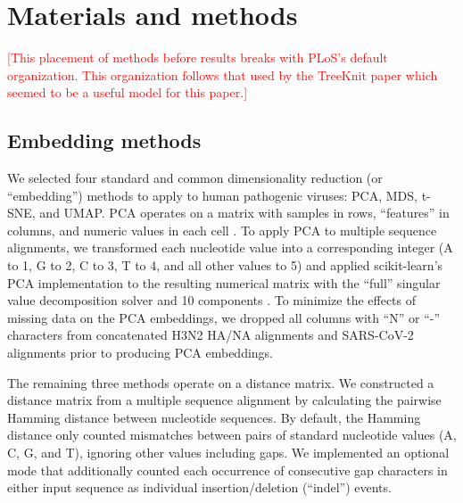 \documentclass[10pt,letterpaper]{article}
\def\jhc#1{\textcolor{red}{[#1]}}
\begin{document}
\section*{Materials and methods}
\jhc{This placement of methods before results breaks with PLoS's default organization. This organization follows that used by the TreeKnit paper which seemed to be a useful model for this paper.}

\subsection*{Embedding methods}

We selected four standard and common dimensionality reduction (or ``embedding'') methods to apply to human pathogenic viruses: PCA, MDS, t-SNE, and UMAP.
PCA operates on a matrix with samples in rows, ``features'' in columns, and numeric values in each cell \cite{jolliffe_cadima_2016}.
To apply PCA to multiple sequence alignments, we transformed each nucleotide value into a corresponding integer (A to 1, G to 2, C to 3, T to 4, and all other values to 5) and applied scikit-learn's PCA implementation to the resulting numerical matrix with the ``full'' singular value decomposition solver and 10 components \cite{Pedregosa2011}.
To minimize the effects of missing data on the PCA embeddings, we dropped all columns with ``N'' or ``-'' characters from concatenated H3N2 HA/NA alignments and SARS-CoV-2 alignments prior to producing PCA embeddings.

The remaining three methods operate on a distance matrix.
We constructed a distance matrix from a multiple sequence alignment by calculating the pairwise Hamming distance between nucleotide sequences.
By default, the Hamming distance only counted mismatches between pairs of standard nucleotide values (A, C, G, and T), ignoring other values including gaps.
We implemented an optional mode that additionally counted each occurrence of consecutive gap characters in either input sequence as individual insertion/deletion (``indel'') events.
\end{document}
